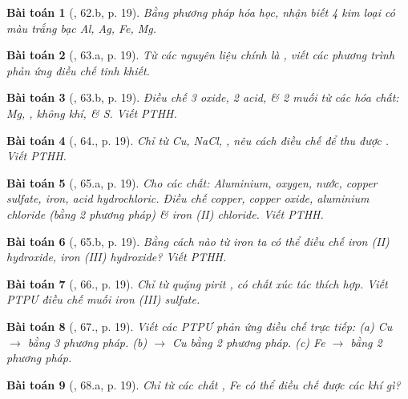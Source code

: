 \documentclass{article}
\newtheorem{baitoan}{Bài toán}
\begin{document}
\begin{baitoan}[\cite{An_400_BT_Hoa_Hoc_9}, 62.b, p. 19]
	Bằng phương pháp hóa học, nhận biết 4 kim loại có màu trắng bạc {\rm Al, Ag, Fe, Mg}.
\end{baitoan}

\begin{baitoan}[\cite{An_400_BT_Hoa_Hoc_9}, 63.a, p. 19]
	Từ các nguyên liệu chính là {\rm{}}, viết các phương trình phản ứng điều chế {\rm{}} tinh khiết.
\end{baitoan}

\begin{baitoan}[\cite{An_400_BT_Hoa_Hoc_9}, 63.b, p. 19]
	Điều chế 3 oxide, 2 acid, \& 2 muối từ các hóa chất: {\rm Mg, }, không khí, \& {\rm S}. Viết {\rm PTHH}.
\end{baitoan}

\begin{baitoan}[\cite{An_400_BT_Hoa_Hoc_9}, 64., p. 19]
	Chỉ từ {\rm Cu, NaCl, }, nêu cách điều chế để thu được {\rm{}}. Viết {\rm PTHH}.
\end{baitoan}

\begin{baitoan}[\cite{An_400_BT_Hoa_Hoc_9}, 65.a, p. 19]
	Cho các chất: Aluminium, oxygen, nước, copper sulfate, iron, acid hydrochloric. Điều chế copper, copper oxide, aluminium chloride (bằng 2 phương pháp) \& iron ({\rm II}) chloride. Viết {\rm PTHH}.
\end{baitoan}

\begin{baitoan}[\cite{An_400_BT_Hoa_Hoc_9}, 65.b, p. 19]
	Bằng cách nào từ iron ta có thể điều chế iron ({\rm II}) hydroxide, iron ({\rm III}) hydroxide? Viết {\rm PTHH}.
\end{baitoan}

\begin{baitoan}[\cite{An_400_BT_Hoa_Hoc_9}, 66., p. 19]
	Chỉ từ quặng pirit {\rm{}}, có chất xúc tác thích hợp. Viết {\rm PTPƯ} điều chế muối iron ({\rm III}) sulfate.
\end{baitoan}

\begin{baitoan}[\cite{An_400_BT_Hoa_Hoc_9}, 67., p. 19]
	Viết các {\rm PTPƯ} phản ứng điều chế trực tiếp: (a) {\rm Cu $\to$  bằng 3 phương pháp}. (b) {\rm{} $\to$ Cu} bằng 2 phương pháp. (c) {\rm Fe $\to$ } bằng 2 phương pháp.
\end{baitoan}

\begin{baitoan}[\cite{An_400_BT_Hoa_Hoc_9}, 68.a, p. 19]
	Chỉ từ các chất {\rm{}, Fe} có thể điều chế được các khí gì?
\end{baitoan}
\end{document}
